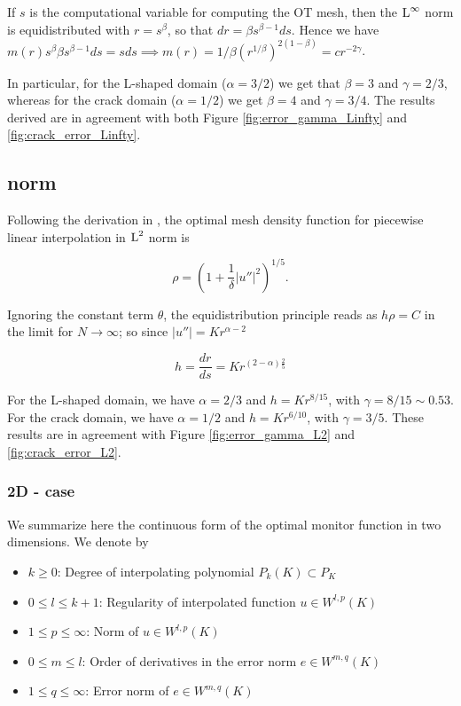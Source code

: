 \documentclass[a4paper,11pt]{article}
\begin{document}
{If $s$ is the computational variable for computing the OT mesh, then the $\operatorname L^{\infty}$ norm is equidistributed with $r = s^{\beta}$, so that $dr = \beta s^{\beta - 1} ds$. Hence we have $m(r) s^{\beta} \beta s^{\beta-1} ds = s ds \implies m(r) = 1/\beta (r^{1/\beta})^{2(1-\beta)} = c r^{-2\gamma}$.

In particular, for the L-shaped domain ($\alpha = 3/2$) we get that $\beta = 3$ and $\gamma = 2/3$, whereas for the crack domain ($\alpha = 1/2$) we get $\beta = 4$ and $\gamma = 3/4$. The results derived are in agreement with both Figure \ref{fig:error_gamma_Linfty} and \ref{fig:crack_error_Linfty}.  

\subsection{ norm}

Following the derivation in \cite{HR:2011}, the optimal mesh density function for piecewise linear interpolation in $\operatorname L^{2}$ norm is

$$\rho = \left(1 + \frac{1}{\delta}|u''|^{2} \right)^{1/5}.$$

Ignoring the constant term $\theta$, the equidistribution principle reads as $h\rho = C$ in the limit for $N \rightarrow \infty$; so since $|u''| = Kr^{\alpha - 2}$

$$h = \frac{dr}{ds} = K r^{(2 -\alpha)\frac{2}{5}}$$

For the L-shaped domain, we have $\alpha = 2/3$ and $h = K r^{8/15}$, with $\gamma = 8/15 \sim 0.53$. For the crack domain, we have $\alpha = 1/2$ and  $h = K r^{6/10}$, with $\gamma = 3/5$. These results are in agreement with Figure \ref{fig:error_gamma_L2} and \ref{fig:crack_error_L2}. 


\subsubsection{2D - case}

We summarize here the continuous form of the optimal monitor function in two dimensions. We denote by

\begin{itemize}
\item $k\geq 0$: Degree of interpolating polynomial  $P_{k}(K) \subset P_{K}$ 
\item $0 \leq l \leq k+1$: Regularity of interpolated function $u \in W^{l,p}(K)$
\item $1 \leq p \leq \infty$: Norm of  $u \in W^{l,p}(K)$
\item $0 \leq m \leq l$: Order of derivatives in the error norm $e \in W^{m,q}(K)$ 
\item $1 \leq q \leq \infty $: Error norm of $e \in W^{m,q}(K)$
\end{itemize}

}
\end{document}
